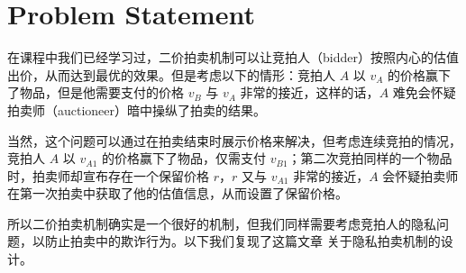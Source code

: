\section{Problem Statement}

在课程中我们已经学习过，二价拍卖机制可以让竞拍人（bidder）按照内心的估值出价，从而达到最优的效果。但是考虑以下的情形：竞拍人 $A$ 以 $v_A$ 的价格赢下了物品，但是他需要支付的价格 $v_B$ 与 $v_A$ 非常的接近，这样的话，$A$ 难免会怀疑拍卖师（auctioneer）暗中操纵了拍卖的结果。

当然，这个问题可以通过在拍卖结束时展示价格来解决，但考虑连续竞拍的情况，竞拍人 $A$ 以 $v_{A1}$ 的价格赢下了物品，仅需支付 $v_{B1}$；第二次竞拍同样的一个物品时，拍卖师却宣布存在一个保留价格 $r$，$r$ 又与 $v_{A1}$ 非常的接近，$A$ 会怀疑拍卖师在第一次拍卖中获取了他的估值信息，从而设置了保留价格。

所以二价拍卖机制确实是一个很好的机制，但我们同样需要考虑竞拍人的隐私问题，以防止拍卖中的欺诈行为。以下我们复现了这篇文章 \cite{naor1999privacy} 关于隐私拍卖机制的设计。

